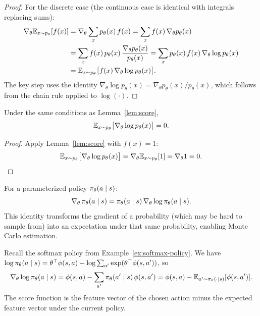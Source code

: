 \documentclass[11pt,a4paper]{article}
\begin{document}
\begin{proof}
For the discrete case (the continuous case is identical with integrals
replacing sums):
\begin{align*}
  \nabla_\theta \mathbb{E}_{x \sim p_\theta}[f(x)]
  &= \nabla_\theta \sum_{x} p_\theta(x)\, f(x)
  = \sum_{x} f(x)\, \nabla_\theta p_\theta(x) \\
  &= \sum_{x} f(x)\, p_\theta(x)\,
     \frac{\nabla_\theta p_\theta(x)}{p_\theta(x)}
  = \sum_{x} p_\theta(x)\, f(x)\, \nabla_\theta \log p_\theta(x) \\
  &= \mathbb{E}_{x \sim p_\theta}\bigl[f(x)\, \nabla_\theta \log p_\theta(x)\bigr].
\end{align*}
The key step uses the identity
$\nabla_\theta \log p_\theta(x) = \nabla_\theta p_\theta(x) / p_\theta(x)$,
which follows from the chain rule applied to $\log(\cdot)$.
\end{proof}

\begin{lemma}
\label{lem:score-zero-mean}
Under the same conditions as Lemma~\ref{lem:score},
\[
  \mathbb{E}_{x \sim p_\theta}\bigl[\nabla_\theta \log p_\theta(x)\bigr] = 0.
\]
\end{lemma}

\begin{proof}
Apply Lemma~\ref{lem:score} with $f(x) = 1$:
\[
  \mathbb{E}_{x \sim p_\theta}\bigl[\nabla_\theta \log p_\theta(x)\bigr]
  = \nabla_\theta \mathbb{E}_{x \sim p_\theta}[1]
  = \nabla_\theta 1 = 0. \qedhere
\]
\end{proof}

\begin{keyresult}[title={The Log-Derivative Trick}]
For a parameterized policy $\pi_\theta(a \mid s)$:
\[
  \nabla_\theta\, \pi_\theta(a \mid s)
  = \pi_\theta(a \mid s)\, \nabla_\theta \log \pi_\theta(a \mid s).
\]
This identity transforms the gradient of a probability (which may be hard
to sample from) into an expectation under that same probability, enabling
Monte Carlo estimation.
\end{keyresult}

\begin{example}
\label{ex:score-softmax}
Recall the softmax policy from Example~\ref{ex:softmax-policy}. We have
$\log \pi_\theta(a \mid s) = \theta^\top \phi(s,a) -
\log\sum_{a'} \exp(\theta^\top \phi(s,a'))$, so
\[
  \nabla_\theta \log \pi_\theta(a \mid s)
  = \phi(s,a) - \sum_{a'} \pi_\theta(a' \mid s)\, \phi(s,a')
  = \phi(s,a) - \mathbb{E}_{a' \sim \pi_\theta(\cdot \mid s)}[\phi(s,a')].
\]
The score function is the feature vector of the chosen action minus the
expected feature vector under the current policy.
\end{example}
\end{document}
